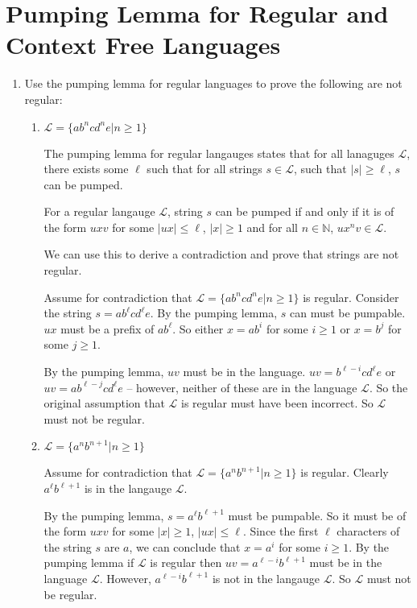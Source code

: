 \documentclass[10pt,\jkfside,a4paper]{article}
\begin{document}
\begin{enumerate}
\begin{enumerate}
\end{enumerate}

\end{enumerate}

\section{Pumping Lemma for Regular and Context Free Languages}

\begin{enumerate}

\item Use the pumping lemma for regular languages to prove the following are
not regular:

\begin{enumerate}

\item $\mathcal L = \{a b^n c d^n e| n \ge 1\}$

The pumping lemma for regular langauges states that for all lanaguges
$\mathcal L$, there exists some $\ell$ such that for all strings $s \in
\mathcal L$, such that $|s| \ge \ell$, $s$ can be pumped.

For a regular langauge $\mathcal L$, string $s$ can be pumped if and only if
it is of the form $u x v$ for some $|ux| \le \ell$, $|x| \ge 1$ and for all $n
\in \mathbb N$, $u x^n v \in \mathcal L$.

We can use this to derive a contradiction and prove that strings are not
regular.

Assume for contradiction that $\mathcal L = \{a b^n c d^n e | n \ge 1\}$ is
regular. Consider the string $s = a b^\ell c d^\ell e$. By the pumping
lemma, $s$ can must be pumpable. $ux$ must be a prefix of $ab^\ell$. So
either $x = ab^i$ for some $i \ge 1$ or $x = b^j$ for some $j \ge 1$.

By the pumping lemma, $uv$ must be in the language. $uv = b^{\ell - i} c
d^\ell e$ or $uv = a b^{\ell - j} c d^\ell e$ -- however, neither of these
are in the language $\mathcal L$. So the original assumption that $\mathcal
L$ is regular must have been incorrect. So $\mathcal L$ must not be regular.

\item $\mathcal L = \{a^n b^{n+1}| n \ge 1\}$

Assume for contradiction that $\mathcal L = \{a^n b^{n+1}| n \ge 1\}$ is
regular. Clearly $a^\ell b^{\ell + 1}$ is in the langauge $\mathcal L$.

By the pumping lemma, $s = a^\ell b^{\ell + 1}$ must be pumpable. So it must
be of the form $uxv$ for some $|x| \ge 1$, $|ux| \le \ell$. Since the first
$\ell$ characters of the string $s$ are $a$, we can conclude that $x = a^i$
for some $i \ge 1$. By the pumping lemma if $\mathcal L$ is regular then $uv =
a^{\ell - i} b^{\ell + 1}$ must be in the language $\mathcal L$. However,
$a^{\ell - i} b^{\ell + 1}$ is not in the langauge $\mathcal L$. So
$\mathcal L$ must not be regular.


\end{enumerate}
\end{enumerate}
\end{document}
